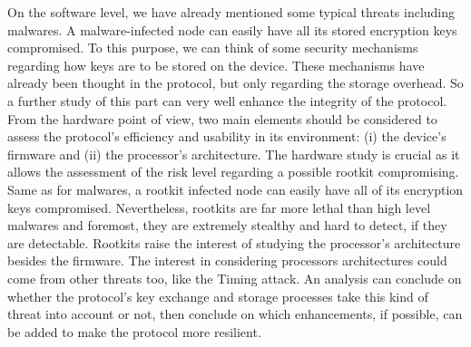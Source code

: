 On the software level, we have already mentioned some typical threats including malwares. A malware-infected node can easily have all its stored encryption keys compromised. To this purpose, we can think of some security mechanisms regarding how keys are to be stored on the device. These mechanisms have already been thought in the protocol, but only regarding the storage overhead. So a further study of this part can very well enhance the integrity of the protocol.
From the hardware point of view, two main elements should be considered to assess the protocol’s efficiency and usability in its environment: (i) the device’s firmware and (ii) the processor’s architecture. The hardware study is crucial as it allows the assessment of the risk level regarding a possible rootkit compromising. Same as for malwares, a rootkit infected node can easily have all of  its encryption keys compromised. Nevertheless, rootkits are far more lethal than high level malwares and foremost, they are extremely stealthy and hard to detect, if they are detectable. Rootkits raise the interest of studying the processor’s architecture besides the firmware. The interest in considering processors architectures could come from other threats too, like the Timing attack. An analysis can conclude on whether the protocol’s key exchange and storage processes take this kind of threat into account or not, then conclude on which enhancements, if possible, can be added to make the protocol more resilient.